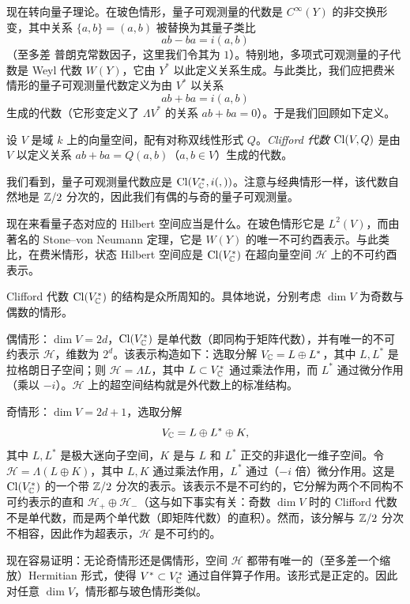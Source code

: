 现在转向量子理论。在玻色情形，量子可观测量的代数是 $C^\infty(Y)$ 的非交换形变，其中关系 $\lbrace{a,b\rbrace}=(a,b)$ 被替换为其量子类比
$$
ab-ba=i(a,b)
$$
（至多差 普朗克常数因子，这里我们令其为 $1$）。特别地，多项式可观测量的子代数是 Weyl 代数 $W(Y)$，它由 $Y^*$ 以此定义关系生成。与此类比，我们应把费米情形的量子可观测量代数定义为由 $V^*$ 以关系
$$
ab+ba=i(a,b)
$$
生成的代数（它形变定义了 $\Lambda V^*$ 的关系 $ab+ba=0$）。于是我们回顾如下定义。

\begin{definition} 设 $V$ 是域 $k$ 上的向量空间，配有对称双线性形式 $Q$。\emph{Clifford 代数} ${\rm Cl}(V,Q)$ 是由 $V$ 以定义关系 $ab+ba=Q(a,b)$（$a,b\in V$）生成的代数。
\end{definition}

我们看到，量子可观测量代数应是 ${\rm Cl}(V_{\Bbb C}^*,i(,))$。注意与经典情形一样，该代数自然地是 $\Bbb Z/2$ 分次的，因此我们有偶的与奇的量子可观测量。

现在来看量子态对应的 Hilbert 空间应当是什么。在玻色情形它是 $L^2(V)$，而由著名的 Stone–von Neumann 定理，它是 $W(Y)$ 的唯一不可约酉表示。与此类比，在费米情形，状态 Hilbert 空间应是 ${\rm Cl}(V^*_{\Bbb C})$ 在超向量空间 ${\mathcal H}$ 上的不可约酉表示。

Clifford 代数 ${\rm Cl}(V^*_{\Bbb C})$ 的结构是众所周知的。具体地说，分别考虑 $\dim V$ 为奇数与偶数的情形。

偶情形：$\dim V=2d$，${\rm Cl}(V^*_{\Bbb C})$ 是单代数（即同构于矩阵代数），并有唯一的不可约表示 ${\mathcal H}$，维数为 $2^d$。该表示构造如下：选取分解 $V_{\Bbb C}=L\oplus L^*$，其中 $L,L^*$ 是拉格朗日子空间；则 ${\mathcal H}=\Lambda L$，其中 $L\subset V^*_\Bbb C$ 通过乘法作用，而 $L^*$ 通过微分作用（乘以 $-i$）。${\mathcal H}$ 上的超空间结构就是外代数上的标准结构。

奇情形：$\dim V=2d+1$，选取分解
$$
V_{\Bbb C}=
L\oplus L^*\oplus K,
$$
其中 $L,L^*$ 是极大迷向子空间，$K$ 是与 $L$ 和 $L^*$ 正交的非退化一维子空间。令 ${\mathcal H}=\Lambda(L\oplus K)$，其中 $L,K$ 通过乘法作用，$L^*$ 通过（$-i$ 倍）微分作用。这是 ${\rm Cl}(V^*_{\Bbb C})$ 的一个带 ${\Bbb Z/2}$ 分次的表示。该表示不是不可约的，它分解为两个不同构不可约表示的直和 ${\mathcal H}_+\oplus {\mathcal
H}_-$（这与如下事实有关：奇数 $\dim V$ 时的 Clifford 代数不是单代数，而是两个单代数（即矩阵代数）的直积）。然而，该分解与 ${\Bbb Z/2}$ 分次不相容，因此作为超表示，${\mathcal H}$ 是不可约的。

现在容易证明：无论奇情形还是偶情形，空间 ${\mathcal H}$ 都带有唯一的（至多差一个缩放）Hermitian 形式，使得 $V^*\subset V^*_{\Bbb C}$ 通过自伴算子作用。该形式是正定的。因此对任意 $\dim V$，情形都与玻色情形类似。

